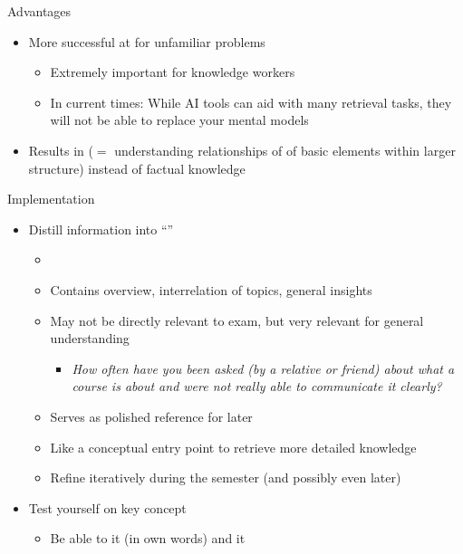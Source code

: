 \documentclass{ercisbeamer}
\begin{document}
\begin{frame}{Advantages}
    \begin{itemize}
        \item More successful at  for unfamiliar problems
        \begin{itemize}
            \item Extremely important for knowledge workers
            \item In current times: While AI tools  can aid with many retrieval tasks, they will not be able to replace your mental models 
        \end{itemize}
        \item Results in  ($=$ understanding relationships of of basic elements within larger structure) instead of factual knowledge
    \end{itemize}
\end{frame}

\begin{frame}{Implementation}
    \begin{tbox}
        \begin{itemize}
            \item Distill information into ``''
            \begin{itemize}
                \item {}
                \item Contains overview, interrelation of topics, general insights
                \item May not be directly relevant to exam, but very relevant for general understanding
                \begin{itemize}
                    \item \emph{How often have you been asked (by a relative or friend) about what a course is about and were not really able to communicate it clearly?}
                \end{itemize}
                \item Serves as polished reference for later
                \item Like a conceptual entry point to retrieve more detailed knowledge
                \item Refine iteratively during the semester (and possibly even later)
            \end{itemize}
            \item Test yourself on key concept
            \begin{itemize}
                \item Be able to  it (in own words) and  it
            \end{itemize}
        \end{itemize}
    \end{tbox}
\end{frame}
\setbgimage{}
\end{document}
